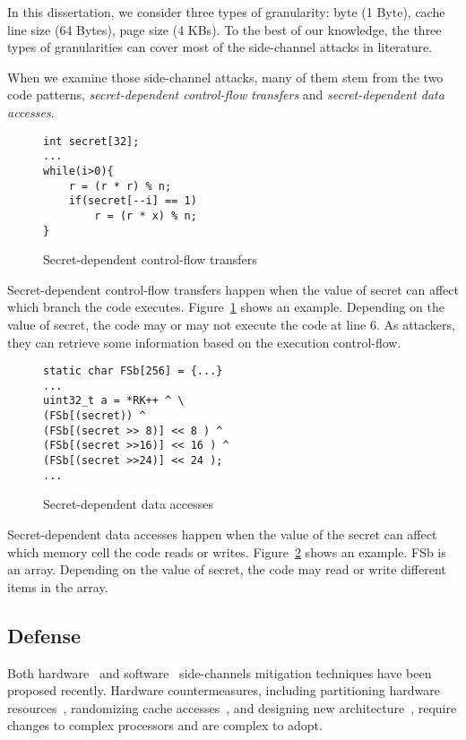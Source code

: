 In this dissertation, we consider three types of granularity: byte (1 Byte), cache line size (64 Bytes), page size (4 KBs). To the best of our knowledge, the three types of granularities can cover most of the side-channel attacks in literature.

When we examine those side-channel attacks, many of them stem from the two code patterns, \emph{secret-dependent control-flow transfers} and \emph{secret-dependent data accesses}.
\begin{figure}[h]
\begin{lstlisting}[xleftmargin=.32\textwidth, xrightmargin=.32\textwidth]
int secret[32];
...
while(i>0){
    r = (r * r) % n;
    if(secret[--i] == 1)
        r = (r * x) % n;   
}
\end{lstlisting}
\caption{Secret-dependent control-flow transfers}
\label{fig:secret:cf}
\end{figure}

Secret-dependent control-flow transfers happen when the value of secret can affect which branch the code executes. Figure~\ref{fig:secret:cf} shows an example. Depending on the value of \textsf{secret}, the code may or may not execute the code at line 6. As attackers, they can retrieve some information based on the execution control-flow. 

\begin{figure}[h]
\begin{lstlisting}[xleftmargin=.32\textwidth, xrightmargin=.32\textwidth]
static char FSb[256] = {...}
... 
uint32_t a = *RK++ ^ \ 
(FSb[(secret)) ^
(FSb[(secret >> 8)] << 8 ) ^
(FSb[(secret >>16)] << 16 ) ^
(FSb[(secret >>24)] << 24 );
...
\end{lstlisting}
\caption{Secret-dependent data accesses}
\label{fig:secret:da}
\end{figure}

Secret-dependent data accesses happen when the value of the secret can affect which memory cell the code reads or writes. Figure~\ref{fig:secret:da} shows an example. \textsf{FSb} is an array. Depending on the value of \textsf{secret}, the code may read or write different items in the array. 

\subsection{Defense}



Both hardware~\cite{Page2005PartitionedCA,
Wang:2007:NCD:1250662.1250723,Zhang:2015:HDL:2775054.2694372,Li:2014:SLH:2541940.2541947,
236344, 236334} and software~\cite{shih2017t,Coppens:2009:PMT:1607723.1608124,
brickell2006software,crane2015thwarting, 197207} side-channels mitigation techniques have
been proposed recently. Hardware countermeasures, including partitioning hardware resources~\cite{Page2005PartitionedCA}, randomizing cache
accesses~\cite{Wang:2007:NCD:1250662.1250723, 236344}, and designing new
architecture~\cite{tiwari2011crafting}, require changes to complex processors and are complex to adopt. 

